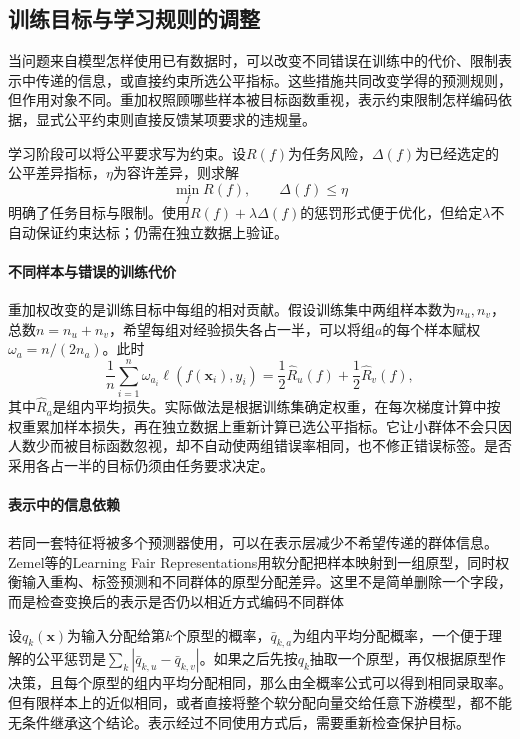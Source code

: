 \subsection{训练目标与学习规则的调整}
\label{sec:fairness-learning-intervention}

当问题来自模型怎样使用已有数据时，可以改变不同错误在训练中的代价、限制表示中传递的信息，或直接约束所选公平指标。这些措施共同改变学得的预测规则，但作用对象不同。重加权照顾哪些样本被目标函数重视，表示约束限制怎样编码依据，显式公平约束则直接反馈某项要求的违规量。

学习阶段可以将公平要求写为约束。设$R(f)$为任务风险，$\Delta(f)$为已经选定的公平差异指标，$\eta$为容许差异，则求解
\[
 \min_f R(f),\qquad \Delta(f)\leq\eta
\]
明确了任务目标与限制。使用$R(f)+\lambda\Delta(f)$的惩罚形式便于优化，但给定$\lambda$不自动保证约束达标；仍需在独立数据上验证。

\paragraph{不同样本与错误的训练代价}

重加权改变的是训练目标中每组的相对贡献。假设训练集中两组样本数为$n_u,n_v$，总数$n=n_u+n_v$，希望每组对经验损失各占一半，可以将组$a$的每个样本赋权$\omega_a=n/(2n_a)$。此时
\[
 \frac1n\sum_{i=1}^{n}\omega_{a_i}\ell(f(\bm x_i),y_i)
 =\frac12\hat R_u(f)+\frac12\hat R_v(f),
\]
其中$\hat R_a$是组内平均损失。实际做法是根据训练集确定权重，在每次梯度计算中按权重累加样本损失，再在独立数据上重新计算已选公平指标。它让小群体不会只因人数少而被目标函数忽视，却不自动使两组错误率相同，也不修正错误标签。是否采用各占一半的目标仍须由任务要求决定。

\paragraph{表示中的信息依赖}

若同一套特征将被多个预测器使用，可以在表示层减少不希望传递的群体信息。Zemel等的Learning Fair Representations用软分配把样本映射到一组原型，同时权衡输入重构、标签预测和不同群体的原型分配差异。这里不是简单删除一个字段，而是检查变换后的表示是否仍以相近方式编码不同群体

设$q_k(\bm{x})$为输入分配给第$k$个原型的概率，$\bar q_{k,a}$为组内平均分配概率，一个便于理解的公平惩罚是$\sum_k|\bar q_{k,u}-\bar q_{k,v}|$。如果之后先按$q_k$抽取一个原型，再仅根据原型作决策，且每个原型的组内平均分配相同，那么由全概率公式可以得到相同录取率。但有限样本上的近似相同，或者直接将整个软分配向量交给任意下游模型，都不能无条件继承这个结论。表示经过不同使用方式后，需要重新检查保护目标。


